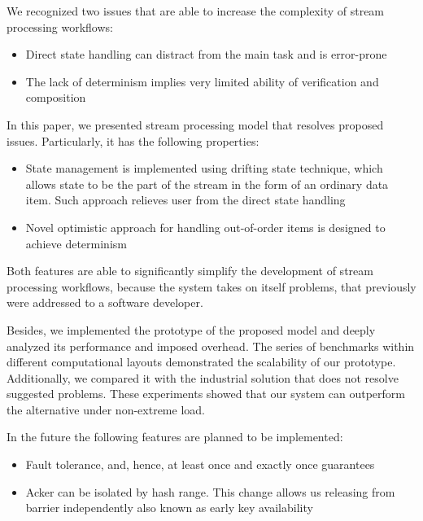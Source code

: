 
\label {fs-conclusions}

We recognized two issues that are able to increase the complexity of stream processing workflows:

\begin{itemize}
    \item Direct state handling can distract from the main task and is error-prone 
    \item The lack of determinism implies very limited ability of verification and composition
\end{itemize}

In this paper, we presented stream processing model that resolves proposed issues. Particularly, it has the following properties:

\begin{itemize}
    \item State management is implemented using drifting state technique, which allows state to be the part of the stream in the form of an ordinary data item. Such approach relieves user from the direct state handling
    \item Novel optimistic approach for handling out-of-order items is designed to achieve determinism
\end{itemize}

Both features are able to significantly simplify the development of stream processing workflows, because the system takes on itself problems, that previously were addressed to a software developer.

Besides, we implemented the prototype of the proposed model and deeply analyzed its performance and imposed overhead. The series of benchmarks within different computational layouts demonstrated the scalability of our prototype. Additionally, we compared it with the industrial solution that does not resolve suggested problems. These experiments showed that our system can outperform the alternative under non-extreme load.

In the future the following features are planned to be implemented:
\begin{itemize}
    \item Fault tolerance, and, hence, at least once and exactly once guarantees
    \item Acker can be isolated by hash range. This change allows us releasing from barrier independently also known as early key availability
\end{itemize}
